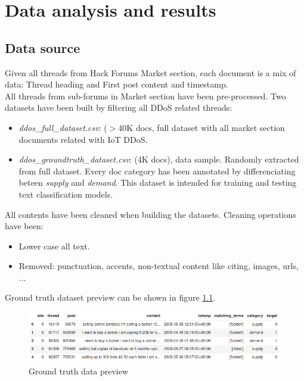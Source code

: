 \chapter{Data analysis and results}
\label{chapter:data_analysis_results}

\section{Data source}

Given all threads from Hack Forums Market section, each document is a mix of data: Thread heading and First post content and timestamp.\\
All threads from sub-forums in Market section have been pre-processed. Two datasets have been built by filtering all DDoS related threads:
\begin{itemize}
    \item \textit{ddos\_full\_dataset.csv}: ($>$40K docs, full dataset with all market section documents related with IoT DDoS.
    \item \textit{ddos\_groundtruth\_dataset.csv}: (4K docs), data sample. Randomly extracted from full dataset. Every doc category has been annotated by differenciating beteen \textit{supply} and \textit{demand}. This dataset is intended for training and testing text classification models.
\end{itemize}

All contents have been cleaned when building the datasets. Cleaning operations have been:
\begin{itemize}
    \item Lower case all text.
    \item Removed: punctuation, accents, non-textual content like citing, images, urls, ...
\end{itemize}

Ground truth dataset preview can be shown in figure \ref{fig:ground_truth_preview}.

\begin{figure}[H]
	\centering
	\includegraphics[width=1.0\textwidth]{figs/ground_truth_preview.png}
	\caption{Ground truth data preview}
	\label{fig:ground_truth_preview}
\end{figure}

